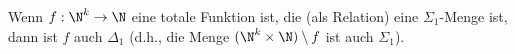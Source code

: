 
\begin{exercise}[220]

\phantom{}
	Wenn $f: \N^k \to \N$ eine totale Funktion ist, die (als Relation) eine $\Sigma_1$-Menge ist, dann ist $f$ auch $\Delta_1$ (d.h., die Menge $(\N^k \times \N) \setminus f$ ist auch $\Sigma_1$). 

\end{exercise}


\begin{solution}

\phantom{}

\end{solution}
